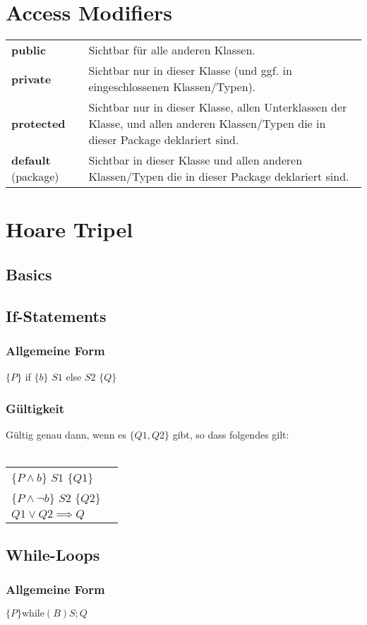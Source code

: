 \documentclass[12pt,a4paper]{article}
\begin{document}
\section{Access Modifiers}
\begin{tabularx}{\linewidth}{ l X }
\textbf{public} & Sichtbar für alle anderen Klassen.\\
\textbf{private} & Sichtbar nur in dieser Klasse (und ggf. in eingeschlossenen Klassen/Typen).\\
\textbf{protected} & Sichtbar nur in dieser Klasse, allen Unterklassen der Klasse, und allen anderen Klassen/Typen die in dieser Package deklariert sind.\\
\textbf{default} (package) & Sichtbar in dieser Klasse und allen anderen Klassen/Typen die in dieser Package deklariert sind.
\end{tabularx}
\section{Hoare Tripel}
\subsection{Basics} %
\subsection{If-Statements}
\subsubsection{Allgemeine Form}
$\{P\}$ if $\{b\}$ $S1$ else $S2$ $\{Q\}$
\subsubsection{Gültigkeit}
Gültig genau dann, wenn es $\{Q1, Q2\}$ gibt, so dass folgendes gilt:\\\\
\begin{tabular}{ll}
$\{P \land b\}$ $S1$ $\{Q1\}$\\
$\{P \land \neg b \}$ $S2$ $\{Q2\}$\\
$Q1 \lor Q2 \implies Q$
\end{tabular}

\subsection{While-Loops}
\subsubsection{Allgemeine Form}
$\{P\} \text{while}(B) S; {Q}$
\end{document}
